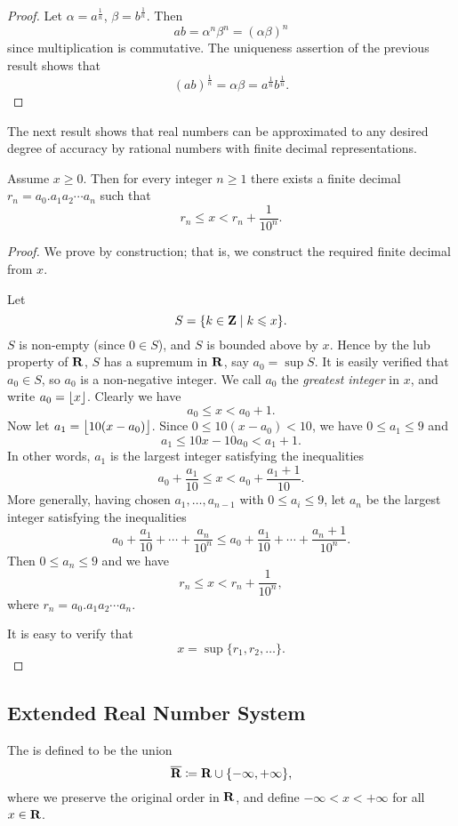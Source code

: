 \begin{proof}
Let $\alpha=a^\frac{1}{n}$, $\beta=b^\frac{1}{n}$. Then
\[ab=\alpha^n\beta^n=(\alpha\beta)^n\]
since multiplication is commutative. The uniqueness assertion of the previous result shows that
\[(ab)^\frac{1}{n}=\alpha\beta=a^\frac{1}{n}b^\frac{1}{n}.\]
\end{proof}

The next result shows that real numbers can be approximated to any desired degree of accuracy by rational numbers with finite decimal representations.

\begin{proposition}
Assume $x\ge0$. Then for every integer $n\ge1$ there exists a finite decimal $r_n=a_0.a_1a_2\cdots a_n$ such that
\[r_n\le x<r_n+\frac{1}{10^n}.\]
\end{proposition}

\begin{proof}
We prove by construction; that is, we construct the required finite decimal from $x$.

Let
\[S=\{k\in\mathbf Z\mid k\leqslant x\}.\]
$S$ is non-empty (since $0\in S$), and $S$ is bounded above by $x$. Hence by the lub property of $\mathbf R$, $S$ has a supremum in $\mathbf R$, say $a_0=\sup S$. It is easily verified that $a_0\in S$, so $a_0$ is a non-negative integer. We call $a_0$ the \emph{greatest integer} in $x$, and write $a_0=\left\lfloor x \right\rfloor$. Clearly we have
\[a_0\le x<a_0+1.\]
Now let $a_1=\left\lfloor 10(x-a_0) \right\rfloor$. Since $0\le 10(x-a_0)<10$, we have $0\le a_1\le 9$ and
\[a_1\le 10x-10a_0<a_1+1.\]
In other words, $a_1$ is the largest integer satisfying the inequalities
\[a_0+\frac{a_1}{10}\le x<a_0+\frac{a_1+1}{10}.\]
More generally, having chosen $a_1,\dots,a_{n-1}$ with $0\le a_i\le 9$, let $a_n$ be the largest integer satisfying the inequalities
\[a_0+\frac{a_1}{10}+\cdots+\frac{a_n}{10^n}\le a_0+\frac{a_1}{10}+\cdots+\frac{a_n+1}{10^n}.\]
Then $0\le a_n\le 9$ and we have
\[r_n\le x<r_n+\frac{1}{10^n},\]
where $r_n=a_0.a_1a_2\cdots a_n$.

It is easy to verify that
\[x=\sup\{r_1,r_2,\dots\}.\]
\end{proof}

\subsection{Extended Real Number System}
\begin{definition}
The  is defined to be the union
\[\overline{\mathbf R}\coloneqq\mathbf R\cup\{-\infty,+\infty\},\]
where we preserve the original order in $\mathbf R$, and define $-\infty<x<+\infty$ for all $x\in\mathbf R$.
\end{definition}

